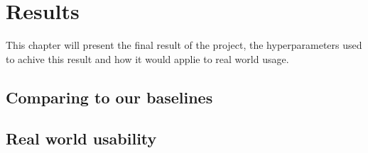 \chapter{Results}
This chapter will present the final result of the project, the hyperparameters used to achive this result and how it would applie to real world usage.
\section{Comparing to our baselines}
\section{Real world usability}